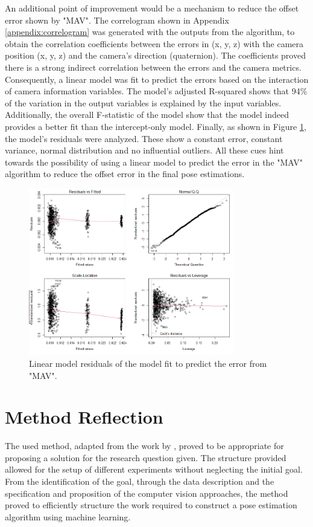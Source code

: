 An additional point of improvement would be a mechanism to reduce the offset error shown by "MAV". The correlogram shown in Appendix \ref{appendix:correlogram} was generated with the outputs from the algorithm, to obtain the correlation coefficients between the errors in (x, y, z) with the camera position (x, y, z) and the camera's direction (quaternion). The coefficients proved there is a strong indirect correlation between the errors and the camera metrics. Consequently, a linear model was fit to predict the errors based on the interaction of camera information variables. The model's adjusted R-squared shows that 94\% of the variation in the output variables is explained by the input variables. Additionally, the overall F-statistic of the model show that the model indeed provides a better fit than the intercept-only model. Finally, as shown in Figure \ref{fig:r_error_asf_xyzquat}, the model's residuals were analyzed. These show a constant error, constant variance, normal distribution and no influential outliers. All these cues hint towards the possibility of using a linear model to predict the error in the "MAV" algorithm to reduce the offset error in the final pose estimations.

 \begin{figure}[h]
        \centering
        \includegraphics[width=0.8\textwidth]{images/r_error_asf_xyzquat.png}
        \caption{Linear model residuals of the model fit to predict the error from "MAV".}
        \label{fig:r_error_asf_xyzquat}
\end{figure}
    


\section{Method Reflection}\label{sec:method-reflection}
The used method, adapted from the work by \cite{luckert2016using}, proved to be appropriate for proposing a solution for the research question given. The structure provided allowed for the setup of different experiments without neglecting the initial goal. From the identification of the goal, through the data description and the specification and proposition of the computer vision approaches, the method proved to efficiently structure the work required to construct a pose estimation algorithm using machine learning.

